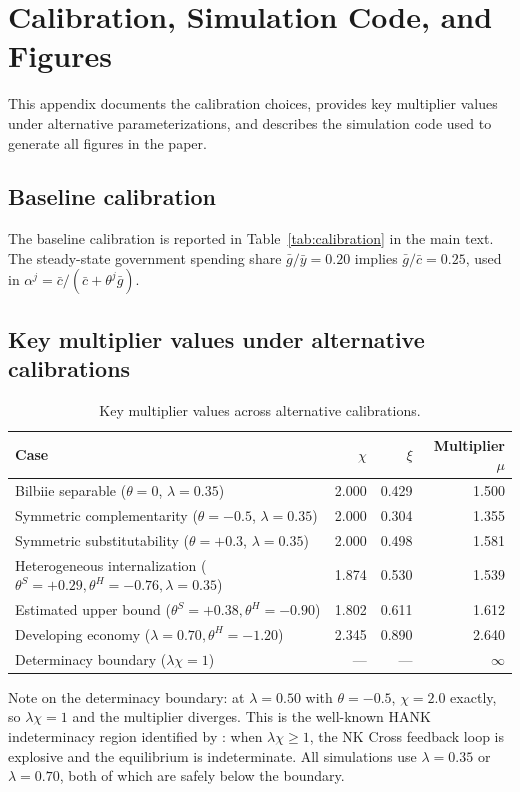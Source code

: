 \section{Calibration, Simulation Code, and Figures}\label{app:calibration}

This appendix documents the calibration choices, provides key multiplier values
under alternative parameterizations, and describes the simulation code used to
generate all figures in the paper.

\subsection{Baseline calibration}\label{app:baseline-calib}
The baseline calibration is reported in Table~\ref{tab:calibration} in the
main text. The steady-state government spending share $\bar g/\bar y=0.20$
implies $\bar g/\bar c=0.25$, used in $\alpha^{j}=\bar c/(\bar c+\theta^{j}\bar g)$.

\subsection{Key multiplier values under alternative calibrations}\label{app:mult-values}

\begin{table}[ht]
\centering\small
\caption{Key multiplier values across alternative calibrations.}
\label{tab:mult-values}
\begin{threeparttable}
\begin{tabular}{@{}lrrr@{}}
\toprule
Case & {$\chi$} & {$\xi$} & {Multiplier $\mu$} \\
\midrule
Bilbiie separable ($\theta=0$, $\lambda=0.35$) & 2.000 & 0.429 & 1.500 \\
Symmetric complementarity ($\theta=-0.5$, $\lambda=0.35$) & 2.000 & 0.304 & 1.355 \\
Symmetric substitutability ($\theta=+0.3$, $\lambda=0.35$) & 2.000 & 0.498 & 1.581 \\
Heterogeneous internalization ($\theta^{S}=+0.29,\theta^{H}=-0.76,\lambda=0.35$) & 1.874 & 0.530 & 1.539 \\
Estimated upper bound ($\theta^{S}=+0.38,\theta^{H}=-0.90$) & 1.802 & 0.611 & 1.612 \\
Developing economy ($\lambda=0.70,\theta^{H}=-1.20$) & 2.345 & 0.890 & 2.640 \\
Determinacy boundary ($\lambda\chi=1$) & --- & --- & $\infty$ \\
\bottomrule
\end{tabular}
\begin{tablenotes}\footnotesize
\item Note on the determinacy boundary: at $\lambda=0.50$ with $\theta=-0.5$,
$\chi=2.0$ exactly, so $\lambda\chi=1$ and the multiplier diverges. This is
the well-known HANK indeterminacy region identified by \citet{Bilbiie2008}:
when $\lambda\chi\ge 1$, the NK Cross feedback loop is explosive and the
equilibrium is indeterminate. All simulations use $\lambda=0.35$ or
$\lambda=0.70$, both of which are safely below the boundary.
\end{tablenotes}
\end{threeparttable}
\end{table}


